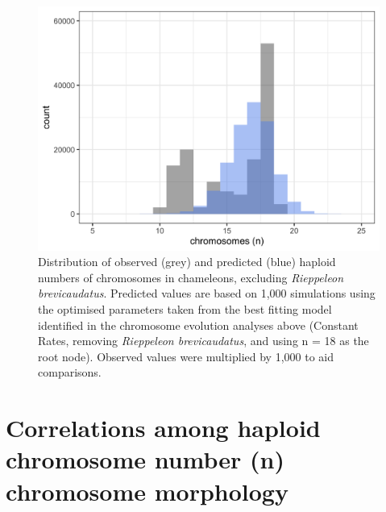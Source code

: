 \documentclass[a4paper, 12pt]{article}
\begin{document}
\newpage
\begin{figure}[H]
 \centering
  \includegraphics[width = \linewidth]{figures/chromevol-simulations-numbers.png}
  \caption{Distribution of observed (grey) and predicted (blue) haploid numbers of chromosomes in chameleons, excluding \textit{Rieppeleon brevicaudatus}. Predicted values are based on 1,000 simulations using the optimised parameters taken from the best fitting model identified in the chromosome evolution analyses above (Constant Rates, removing \textit{Rieppeleon brevicaudatus}, and using n = 18 as the root node). Observed values were multiplied by 1,000 to aid comparisons.
}
  \label{fig-otus-predicted}
\end{figure} 

\newpage
\section{Correlations among haploid chromosome number (n) chromosome morphology}
\end{document}
